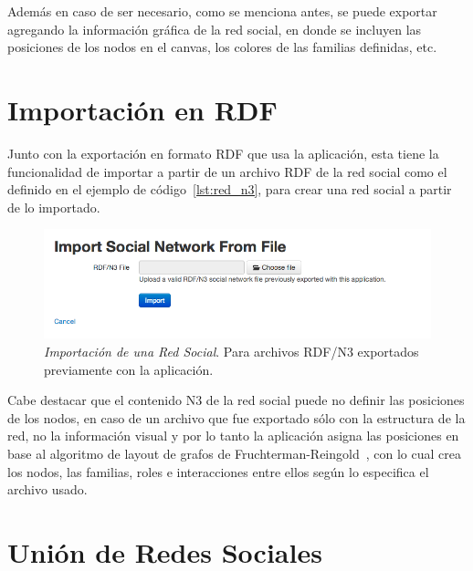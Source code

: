 
\label{lst:vocabulario_n3}

Además en caso de ser necesario, como se menciona antes, se puede exportar agregando la información gráfica de la red social, en donde se incluyen las posiciones de los nodos en el canvas, los colores de las familias definidas, etc.


\section{Importación en RDF} %
\label{sec:importacion_en_rdf}

Junto con la exportación en formato RDF que usa la aplicación, esta tiene la funcionalidad de importar a partir de un archivo RDF de la red social como el definido en el ejemplo de código~\ref{lst:red_n3}, para crear una red social a partir de lo importado.

\begin{figure}[H]
  \centering
  \includegraphics[width=1.0\textwidth]{images/import_sn.png}
  \caption[Importación de una Red Social]{\emph{Importación de una Red Social}. Para archivos RDF/N3 exportados previamente con la aplicación.}
  \label{import_sn}
\end{figure}

Cabe destacar que el contenido N3 de la red social puede no definir las posiciones de los nodos, en caso de un archivo que fue exportado sólo con la estructura de la red, no la información visual y por lo tanto la aplicación asigna las posiciones en base al algoritmo de layout de grafos de Fruchterman-Reingold~\cite{sna}, con lo cual crea los nodos, las familias, roles e interacciones entre ellos según lo especifica el archivo usado.


\section{Unión de Redes Sociales} %
\label{sec:union_de_redes_sociales}

